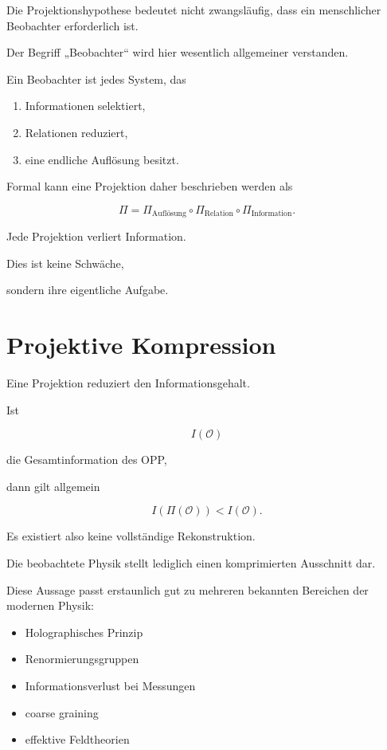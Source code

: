 Die Projektionshypothese bedeutet nicht zwangsläufig, dass ein menschlicher Beobachter erforderlich ist.

Der Begriff „Beobachter“ wird hier wesentlich allgemeiner verstanden.

Ein Beobachter ist jedes System, das

\begin{enumerate}
\item Informationen selektiert,
\item Relationen reduziert,
\item eine endliche Auflösung besitzt.
\end{enumerate}

Formal kann eine Projektion daher beschrieben werden als

\[
\Pi
=
\Pi_{\text{Auflösung}}
\circ
\Pi_{\text{Relation}}
\circ
\Pi_{\text{Information}}.
\]

Jede Projektion verliert Information.

Dies ist keine Schwäche,

sondern ihre eigentliche Aufgabe.

\section*{Projektive Kompression}

Eine Projektion reduziert den Informationsgehalt.

Ist

\[
I(\mathcal O)
\]

die Gesamtinformation des OPP,

dann gilt allgemein

\[
I(\Pi(\mathcal O))
<
I(\mathcal O).
\]

Es existiert also keine vollständige Rekonstruktion.

Die beobachtete Physik stellt lediglich einen komprimierten Ausschnitt dar.

Diese Aussage passt erstaunlich gut zu mehreren bekannten Bereichen der modernen Physik:

\begin{itemize}
\item Holographisches Prinzip
\item Renormierungsgruppen
\item Informationsverlust bei Messungen
\item coarse graining
\item effektive Feldtheorien
\end{itemize}

